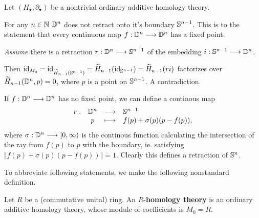 	\begin{theorem}
		Let $(H_\bullet, \partial_\bullet)$ be a nontrivial ordinary additive homology theory.

		For any $n\in \N$ $\D^n$ does not retract onto it's boundary $\S^{n-1}$. This is  to the statement that every continuous map $f:\D^n --> \D^n$ has a fixed point.
	\end{theorem}
	\begin{sketch}
		\textit{Assume} there is a retraction $r: \D^n --> \S^{n-1}$ of the embedding $i:\S^{n-1} --> \D^n$.
		\begin{tab}[1.3cm]
			Then $\id_{M_0} = \id_{\widetilde{H}_{n-1}(\S^{n-1})} = \widetilde{H}_{n-1}(\id_{\S^{n-1}}) = \widetilde{H}_{n-1}(ri)$ factorizes over $\widetilde{H}_{n-1}(\D^n,p) = 0$, where $p$ is a point on $\S^{n-1}$. A contradiction.
		\end{tab}

		If $f:\D^n --> \D^n$ has no fixed point, we can define a continous map 
		\begin{equation*}
			\begin{array}{rccl}
				r:&\D^n & \longrightarrow & \S^{n-1}\\
				&p & \longmapsto & f(p) + \sigma(p)(p - f(p)),
			\end{array}
		\end{equation*}
		where $\sigma:\D^n --> [0,\infty)$ is the continous function calculating the intersection of the ray from $f(p)$ to $p$ with the boundary, ie. satisfying $\Vert f(p) + \sigma(p)(p - f(p))\Vert = 1$. Clearly this defines a retraction of $\S^n$.

	\end{sketch}

	\begin{lemma}
	\end{lemma}

	\begin{lemma}
	\end{lemma}

	To abbreviate following statements, we make the following nonstandard definition.

	\begin{definition}
		Let $R$ be a (commutative unital) ring. An $R$-\textbf{homology theory} is an ordinary additive homology theory, whose module of coefficients is $M_0 = R$.
	\end{definition}

